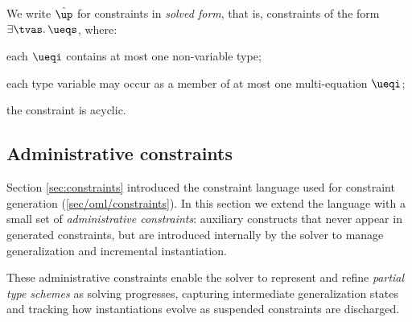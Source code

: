 \documentclass[acmsmall,screen,nonacm%
\Anonymous{,anonymous}{}%
\Final{}{,review}%
]{acmart}
\begin{document}

\begin{definition}
\label{def:solved-form}
  We write $\hat\up$ for constraints in \emph{solved form}, that is,
  constraints of the form $\cexists \tvs {\ueqs}$, where:
\begin{enumerate*}
  \item
    each $\ueqi$ contains at most one non-variable type;
  \item
    each type variable may occur as a member of at most one multi-equation
    $\ueqi$;
  \item the constraint is acyclic.
\end{enumerate*}\relax
\end{definition}


\subsection{Administrative constraints}
\label{sec/solving/admin}


Section \cref{sec:constraints} introduced the constraint language used for
constraint generation (\cref{sec/oml/constraints}). In this section we extend
the language with a small set of \emph{administrative constraints}: auxiliary
constructs that never appear in generated constraints, but are introduced
internally by the solver to manage generalization and incremental
instantiation.


These administrative constraints enable the solver to represent and refine
\emph{partial type schemes} as solving progresses, capturing intermediate
generalization states and tracking how instantiations evolve as suspended
constraints are discharged.
\end{document}
